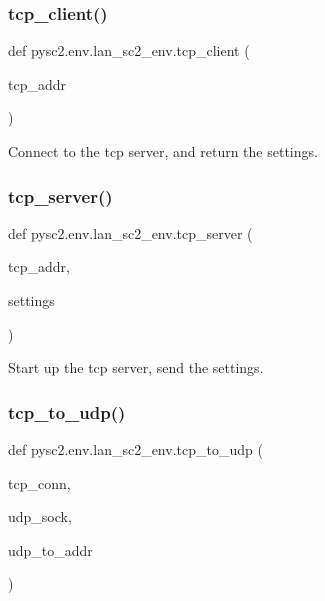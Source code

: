 \subsubsection{\texorpdfstring{tcp\+\_\+client()}{tcp\_client()}}
{\footnotesize\ttfamily def pysc2.\+env.\+lan\+\_\+sc2\+\_\+env.\+tcp\+\_\+client (\begin{DoxyParamCaption}\item[{}]{tcp\+\_\+addr }\end{DoxyParamCaption})}

\begin{DoxyVerb}Connect to the tcp server, and return the settings.\end{DoxyVerb}
 \mbox{\label{namespacepysc2_1_1env_1_1lan__sc2__env_afbc0f05c4223cd53205fab03764798d4}} 
\subsubsection{\texorpdfstring{tcp\+\_\+server()}{tcp\_server()}}
{\footnotesize\ttfamily def pysc2.\+env.\+lan\+\_\+sc2\+\_\+env.\+tcp\+\_\+server (\begin{DoxyParamCaption}\item[{}]{tcp\+\_\+addr,  }\item[{}]{settings }\end{DoxyParamCaption})}

\begin{DoxyVerb}Start up the tcp server, send the settings.\end{DoxyVerb}
 \mbox{\label{namespacepysc2_1_1env_1_1lan__sc2__env_a61cc2ab183c1d44e6608cf31714b6ce5}} 
\subsubsection{\texorpdfstring{tcp\+\_\+to\+\_\+udp()}{tcp\_to\_udp()}}
{\footnotesize\ttfamily def pysc2.\+env.\+lan\+\_\+sc2\+\_\+env.\+tcp\+\_\+to\+\_\+udp (\begin{DoxyParamCaption}\item[{}]{tcp\+\_\+conn,  }\item[{}]{udp\+\_\+sock,  }\item[{}]{udp\+\_\+to\+\_\+addr }\end{DoxyParamCaption})}

